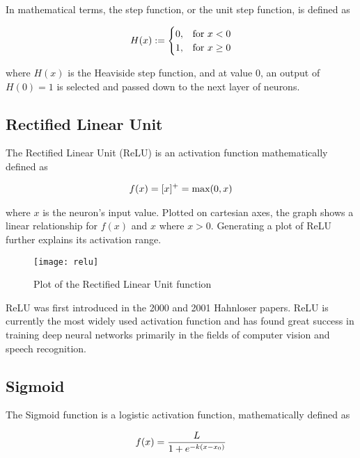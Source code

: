 In mathematical terms, the step function, or the unit step function, is defined as

\begin{align}
    \centering
    H(x) := \begin{cases}
        0, & \text{for } x < 0 \\
        1, & \text{for } x \geq 0
    \end{cases}
\end{align}

where $H(x)$ is the Heaviside step function, and at value 0, an output of $H(0) = 1$ is selected and passed down to the next layer of neurons.

\subsection{Rectified Linear Unit}
The Rectified Linear Unit (ReLU) is an activation function mathematically defined as 

\begin{align}
    \centering
    f(x) = [x]^+ = \text{max}(0, x) 
\end{align}

where $x$ is the neuron's input value. Plotted on cartesian axes, the graph shows a linear relationship for $f(x)$ and $x$ where $x > 0$. Generating a plot of ReLU further explains its activation range.

\begin{figure}[H]
    \centering
    \texttt{[image: relu]}
    \caption{Plot of the Rectified Linear Unit function}
    \label{tab:relu}
\end{figure}

ReLU was first introduced in the 2000 and 2001 Hahnloser papers. ReLU is currently the most widely used activation function and has found great success in training deep neural networks primarily in the fields of computer vision and speech recognition.

\subsection{Sigmoid}
The Sigmoid function is a logistic activation function, mathematically defined as 

\begin{align}
    \centering
    f(x) = \frac{L}{1 + e^{-k(x-x_0)}}
\end{align}


